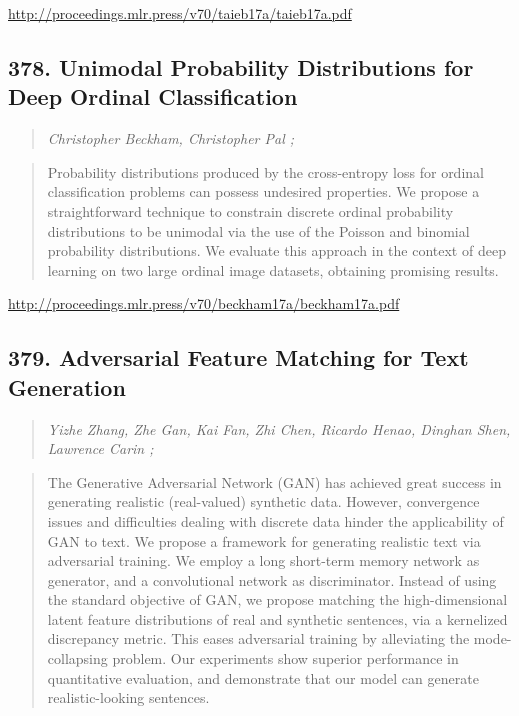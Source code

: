 \documentclass{article}
\begin{document}
\href{http://proceedings.mlr.press/v70/taieb17a/taieb17a.pdf}{http://proceedings.mlr.press/v70/taieb17a/taieb17a.pdf}

\subsection{378. Unimodal Probability Distributions for Deep Ordinal Classification}

\begin{quote}
\footnotesize{\textit{Christopher Beckham, Christopher Pal ;}}

\end{quote}

\begin{quote}
    Probability distributions produced by the cross-entropy loss for ordinal classification problems can possess undesired properties. We propose a straightforward technique to constrain discrete ordinal probability distributions to be unimodal via the use of the Poisson and binomial probability distributions. We evaluate this approach in the context of deep learning on two large ordinal image datasets, obtaining promising results.  
\end{quote}

\href{http://proceedings.mlr.press/v70/beckham17a/beckham17a.pdf}{http://proceedings.mlr.press/v70/beckham17a/beckham17a.pdf}

\subsection{379. Adversarial Feature Matching for Text Generation}

\begin{quote}
\footnotesize{\textit{Yizhe Zhang, Zhe Gan, Kai Fan, Zhi Chen, Ricardo Henao, Dinghan Shen, Lawrence Carin ;}}

\end{quote}

\begin{quote}
    The Generative Adversarial Network (GAN) has achieved great success in generating realistic (real-valued) synthetic data. However, convergence issues and difficulties dealing with discrete data hinder the applicability of GAN to text. We propose a framework for generating realistic text via adversarial training. We employ a long short-term memory network as generator, and a convolutional network as discriminator. Instead of using the standard objective of GAN, we propose matching the high-dimensional latent feature distributions of real and synthetic sentences, via a kernelized discrepancy metric. This eases adversarial training by alleviating the mode-collapsing problem. Our experiments show superior performance in quantitative evaluation, and demonstrate that our model can generate realistic-looking sentences.  
\end{quote}
\end{document}
